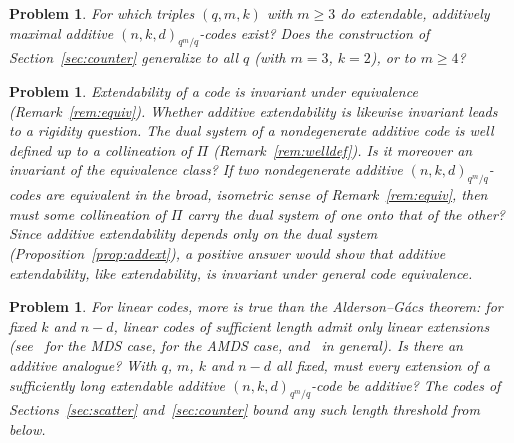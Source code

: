 \documentclass[12pt]{article}
\newtheorem{prob}[thm]{Problem}
\theoremstyle{definition}
\numberwithin{equation}{section}
\newcommand{\Afold}{\mathfrak{F}}
\begin{document}
\begin{prob}
For which triples $(q,m,k)$ with $m\geq3$ do extendable, additively maximal additive $(n,k,d)_{q^m/q}$-codes exist?  Does the construction of Section~\ref{sec:counter} generalize to all $q$ (with $m=3$, $k=2$), or to $m\geq4$?
\end{prob}

\begin{prob}
Extendability of a code is invariant under equivalence (Remark~\ref{rem:equiv}). Whether \emph{additive} extendability is likewise invariant leads to a rigidity question.  The dual system of a nondegenerate additive code is well defined up to a collineation of $\Pi$ (Remark~\ref{rem:welldef}).  Is it moreover an invariant of the equivalence class? If two nondegenerate additive $(n,k,d)_{q^m/q}$-codes are equivalent in the broad, isometric sense of Remark~\ref{rem:equiv}, then must some collineation of $\Pi$ carry the dual system of one onto that of the other?  Since additive extendability depends only on the dual system (Proposition~\ref{prop:addext}), a positive answer would show that additive extendability, like extendability, is invariant under general code equivalence.
\end{prob}

\begin{prob}\label{prob:rigidity}
For linear codes, more is true than the Alderson--G\'acs theorem: for fixed $k$ and $n-d$, linear codes of sufficient length admit \emph{only} linear extensions (see~\cite{AB1} for the MDS case, \cite{MR2398834,MR2389969} for the AMDS case, and~\cite{AB3} in general).  Is there an additive analogue?
With $q$, $m$, $k$ and $n-d$ all fixed, must every extension of a sufficiently long extendable additive $(n,k,d)_{q^m/q}$-code be additive?  The codes of Sections~\ref{sec:scatter} and~\ref{sec:counter} bound any such length threshold from below.
\end{prob}
\end{document}
